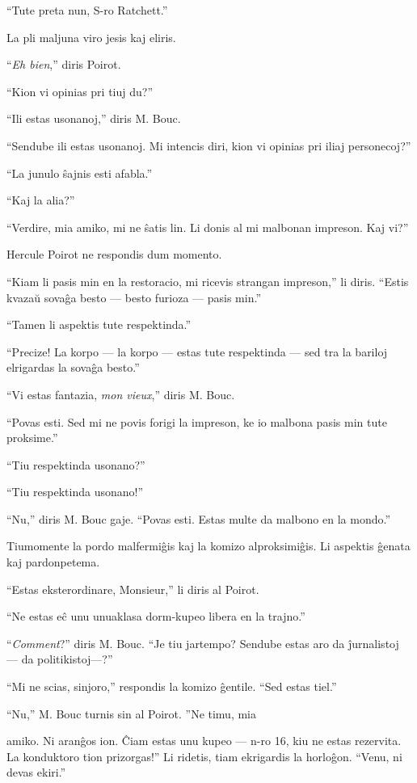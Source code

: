 ``Tute preta nun, S-ro Ratchett.''

La pli maljuna viro jesis kaj eliris.

``\emph{Eh bien},'' diris Poirot.

``Kion vi opinias pri tiuj du?''

``Ili estas usonanoj,'' diris M. Bouc.

``Sendube ili estas usonanoj. Mi intencis diri, kion vi opinias pri iliaj personecoj?''

``La junulo ŝajnis esti afabla.''

``Kaj la alia?''

``Verdire, mia amiko, mi ne ŝatis lin. Li donis al mi malbonan impreson. Kaj vi?''

Hercule Poirot ne respondis dum momento.

``Kiam li pasis min en la restoracio, mi ricevis strangan impreson,'' li diris. ``Estis kvazaŭ sovaĝa besto --- besto furioza --- pasis min.''

``Tamen li aspektis tute respektinda.''

``Precize! La korpo --- la korpo --- estas tute respektinda --- sed tra la bariloj elrigardas la sovaĝa besto.''

``Vi estas fantazia, \emph{mon vieux},'' diris M. Bouc.

``Povas esti. Sed mi ne povis forigi la impreson, ke io malbona pasis min tute proksime.''

``Tiu respektinda usonano?''

``Tiu respektinda usonano!''

``Nu,'' diris M. Bouc gaje. ``Povas esti. Estas multe da malbono en la mondo.''

Tiumomente la pordo malfermiĝis kaj la komizo alproksimiĝis. Li aspektis ĝenata kaj pardonpetema.

``Estas eksterordinare, Monsieur,'' li diris al Poirot.

``Ne estas eĉ unu unuaklasa dorm-kupeo libera en la trajno.''

``\emph{Comment}?'' diris M. Bouc. ``Je tiu jartempo? Sendube estas aro da ĵurnalistoj --- da politikistoj---?''

``Mi ne scias, sinjoro,'' respondis la komizo ĝentile. ``Sed estas tiel.''

``Nu,'' M. Bouc turnis sin al Poirot. ''Ne timu, mia

amiko. Ni aranĝos ion. Ĉiam estas unu kupeo --- n-ro 16, kiu ne estas rezervita. La konduktoro tion prizorgas!'' Li ridetis, tiam ekrigardis la horloĝon. ``Venu, ni devas ekiri.''

